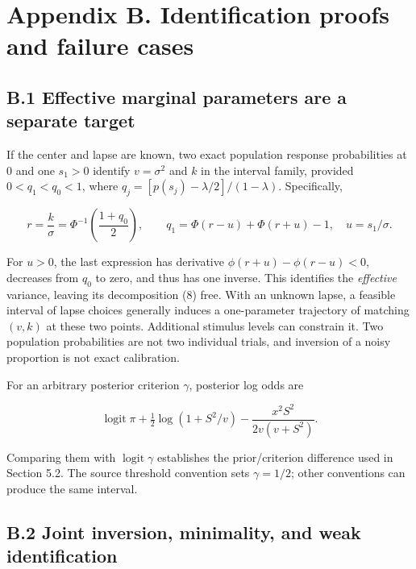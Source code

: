 \documentclass[
  11pt,
]{article}
\let\ctdoldsection\section
\renewcommand{\section}{\Needspace{8\baselineskip}\ctdoldsection}
\let\ctdoldsubsection\subsection
\renewcommand{\subsection}{\Needspace{6\baselineskip}\ctdoldsubsection}
\begin{document}
\hypertarget{appendix-b.-identification-proofs-and-failure-cases}{%
\section{Appendix B. Identification proofs and failure
cases}\label{appendix-b.-identification-proofs-and-failure-cases}}

\hypertarget{b.1-effective-marginal-parameters-are-a-separate-target}{%
\subsection{B.1 Effective marginal parameters are a separate
target}\label{b.1-effective-marginal-parameters-are-a-separate-target}}

If the center and lapse are known, two exact population response
probabilities at \(0\) and one \(s_1>0\) identify \(v=\sigma^2\) and
\(k\) in the interval family, provided \(0<q_1<q_0<1\), where
\(q_j=[p(s_j)-\lambda/2]/(1-\lambda)\). Specifically,

\[
r=\frac{k}{\sigma}=\Phi^{-1}\!\left(\frac{1+q_0}{2}\right),\qquad
q_1=\Phi(r-u)+\Phi(r+u)-1,\quad u=s_1/\sigma .
\]

For \(u>0\), the last expression has derivative
\(\phi(r+u)-\phi(r-u)<0\), decreases from \(q_0\) to zero, and thus has
one inverse. This identifies the \emph{effective} variance, leaving its
decomposition (8) free. With an unknown lapse, a feasible interval of
lapse choices generally induces a one-parameter trajectory of matching
\((v,k)\) at these two points. Additional stimulus levels can constrain
it. Two population probabilities are not two individual trials, and
inversion of a noisy proportion is not exact calibration.

For an arbitrary posterior criterion \(\gamma\), posterior log odds are

\[
\operatorname{logit}\pi+\tfrac12\log(1+S^2/v)
-\frac{x^2S^2}{2v(v+S^2)}.
\]

Comparing them with \(\operatorname{logit}\gamma\) establishes the
prior/criterion difference used in Section 5.2. The source threshold
convention sets \(\gamma=1/2\); other conventions can produce the same
interval.

\hypertarget{b.2-joint-inversion-minimality-and-weak-identification}{%
\subsection{B.2 Joint inversion, minimality, and weak
identification}\label{b.2-joint-inversion-minimality-and-weak-identification}}
\end{document}
